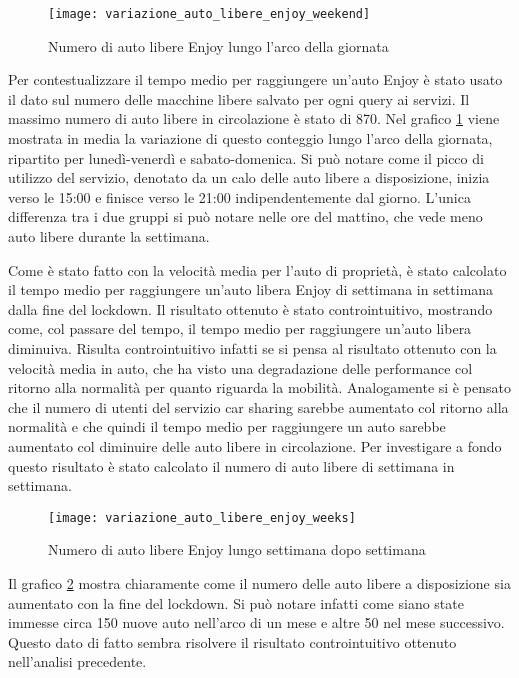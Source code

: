\begin{figure}[H]
	\texttt{[image: variazione\_auto\_libere\_enjoy\_weekend]}
	\caption{Numero di auto libere Enjoy lungo l'arco della giornata}
	\label{image:6}
\end{figure}

Per contestualizzare il tempo medio per raggiungere un'auto Enjoy è stato usato il dato sul numero delle macchine libere salvato per ogni query ai servizi. Il massimo numero di auto libere in circolazione è stato di 870. Nel grafico \ref{image:6} viene mostrata in media la variazione di questo conteggio lungo l'arco della giornata, ripartito per lunedì-venerdì e sabato-domenica. Si può notare come il picco di utilizzo del servizio, denotato da un calo delle auto libere a disposizione, inizia verso le 15:00 e finisce verso le 21:00 indipendentemente dal giorno. L'unica differenza tra i due gruppi si può notare nelle ore del mattino, che vede meno auto libere durante la settimana.


Come è stato fatto con la velocità media per l'auto di proprietà, è stato calcolato il tempo medio per raggiungere un'auto libera Enjoy di settimana in settimana dalla fine del lockdown. Il risultato ottenuto è stato controintuitivo, mostrando come, col passare del tempo, il tempo medio per raggiungere un'auto libera diminuiva. Risulta controintuitivo infatti se si pensa al risultato ottenuto con la velocità media in auto, che ha visto una degradazione delle performance col ritorno alla normalità per quanto riguarda la mobilità. Analogamente si è pensato che il numero di utenti del servizio car sharing sarebbe aumentato col ritorno alla normalità e che quindi il tempo medio per raggiungere un auto sarebbe aumentato col diminuire delle auto libere in circolazione. Per investigare a fondo questo risultato è stato calcolato il numero di auto libere di settimana in settimana.

\begin{figure}[H]
	\texttt{[image: variazione\_auto\_libere\_enjoy\_weeks]}
	\caption{Numero di auto libere Enjoy lungo settimana dopo settimana}
	\label{image:7}
\end{figure}

Il grafico \ref{image:7} mostra chiaramente come il numero delle auto libere a disposizione sia aumentato con la fine del lockdown. Si può notare infatti come siano state immesse circa 150 nuove auto nell'arco di un mese e altre 50 nel mese successivo. Questo dato di fatto sembra risolvere il risultato controintuitivo ottenuto nell'analisi precedente.


